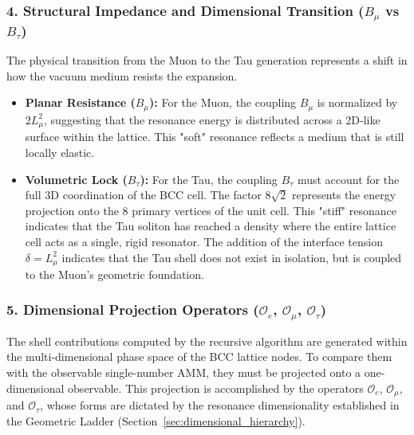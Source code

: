 \documentclass[10pt,a4paper]{article}
\begin{document}
\subsubsection*{4. Structural Impedance and Dimensional Transition ($B_{\mu}$ vs $B_{\tau}$)}
The physical transition from the Muon to the Tau generation represents a shift in how the vacuum medium resists the expansion.
\begin{itemize}
	\item \textbf{Planar Resistance ($B_{\mu}$):} For the Muon, the coupling $B_{\mu}$ is normalized by $2L_{\mu}^2$, suggesting that the resonance energy is distributed across a 2D-like surface within the lattice. This "soft" resonance reflects a medium that is still locally elastic.
	\item \textbf{Volumetric Lock ($B_{\tau}$):} For the Tau, the coupling $B_{\tau}$ must account for the full 3D coordination of the BCC cell. The factor $8\sqrt{2}$ represents the energy projection onto the 8 primary vertices of the unit cell. This "stiff" resonance indicates that the Tau soliton has reached a density where the entire lattice cell acts as a single, rigid resonator. The addition of the interface tension $\delta = L_{\mu}^2$ indicates that the Tau shell does not exist in isolation, but is coupled to the Muon's geometric foundation.
\end{itemize}

\subsubsection*{5. Dimensional Projection Operators ($\mathcal{O}_e$, $\mathcal{O}_\mu$, $\mathcal{O}_\tau$)}
The shell contributions computed by the recursive algorithm are generated within the multi-dimensional phase space of the BCC lattice nodes. To compare them with the observable single-number AMM, they must be projected onto a one-dimensional observable. This projection is accomplished by the operators $\mathcal{O}_e$, $\mathcal{O}_\mu$, and $\mathcal{O}_\tau$, whose forms are dictated by the resonance dimensionality established in the Geometric Ladder (Section~\ref{sec:dimensional_hierarchy}).
\end{document}
